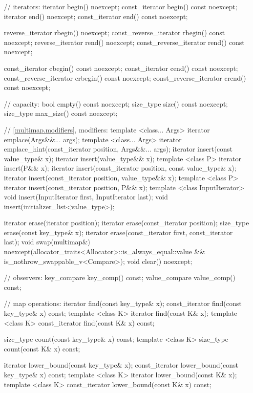 \begin{codeblock}
{{    // iterators:
    iterator               begin() noexcept;
    const_iterator         begin() const noexcept;
    iterator               end() noexcept;
    const_iterator         end() const noexcept;

    reverse_iterator       rbegin() noexcept;
    const_reverse_iterator rbegin() const noexcept;
    reverse_iterator       rend() noexcept;
    const_reverse_iterator rend() const noexcept;

    const_iterator         cbegin() const noexcept;
    const_iterator         cend() const noexcept;
    const_reverse_iterator crbegin() const noexcept;
    const_reverse_iterator crend() const noexcept;

    // capacity:
    bool      empty() const noexcept;
    size_type size() const noexcept;
    size_type max_size() const noexcept;

    // \ref{multimap.modifiers}, modifiers:
    template <class... Args> iterator emplace(Args&&... args);
    template <class... Args> iterator emplace_hint(const_iterator position, Args&&... args);
    iterator insert(const value_type& x);
    iterator insert(value_type&& x);
    template <class P> iterator insert(P&& x);
    iterator insert(const_iterator position, const value_type& x);
    iterator insert(const_iterator position, value_type&& x);
    template <class P> iterator insert(const_iterator position, P&& x);
    template <class InputIterator>
      void insert(InputIterator first, InputIterator last);
    void insert(initializer_list<value_type>);

    iterator  erase(iterator position);
    iterator  erase(const_iterator position);
    size_type erase(const key_type& x);
    iterator  erase(const_iterator first, const_iterator last);
    void      swap(multimap&)
      noexcept(allocator_traits<Allocator>::is_always_equal::value &&
               is_nothrow_swappable_v<Compare>);
    void      clear() noexcept;

    // observers:
    key_compare key_comp() const;
    value_compare value_comp() const;

    // map operations:
    iterator       find(const key_type& x);
    const_iterator find(const key_type& x) const;
    template <class K> iterator       find(const K& x);
    template <class K> const_iterator find(const K& x) const;

    size_type      count(const key_type& x) const;
    template <class K> size_type count(const K& x) const;

    iterator       lower_bound(const key_type& x);
    const_iterator lower_bound(const key_type& x) const;
    template <class K> iterator       lower_bound(const K& x);
    template <class K> const_iterator lower_bound(const K& x) const;

}}
\end{codeblock}

